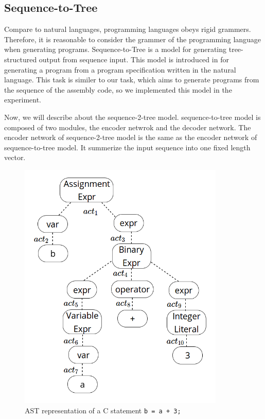 \documentclass[senior,final,11pt]{iscs-thesis}
\begin{document}






\subsection{Sequence-to-Tree}
Compare to natural languages, programming languages obeys rigid grammers. %
Therefore, it is reasonable to consider the grammer of the programming language when generating programs.
Sequence-to-Tree is a model for generating tree-structured output from sequence input. 
This model is introduced in \cite{Seq2Tree} for generating a program from a program specification written in the natural language. 
This task is similer to our task, which aims to generate programs from the sequence of the assembly code, so we implemented this model in the experiment.

Now, we will describe about the sequence-2-tree model.
sequence-to-tree model is composed of two modules, the encoder netwrok and the decoder network.
The encoder network of sequence-2-tree model is the same as the encoder network of sequence-to-tree model. It summerize the input sequence into one fixed length vector.

\begin{figure}[]
	\begin{center}
	\includegraphics[height=12cm]{ast_zu.png}
	\end{center}
	\caption{AST representation of a C statement \texttt{b = a + 3;} }
	\label{fig:ast_zu}
\end{figure}
\end{document}
